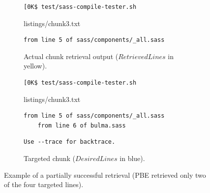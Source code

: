 \begin{figure}[tbp]
  \centering
\begin{subfigure}[b]{\columnwidth}
  \begin{lstlisting}[breaklines=true,frame=tlr]
[0K$ test/sass-compile-tester.sh
  \end{lstlisting}
  \vspace{-\baselineskip}
  
	{listings/chunk3.txt}
  \vspace{-\baselineskip}
  \begin{lstlisting}[breaklines=true,frame=blr]
	from line 5 of sass/components/_all.sass
  \end{lstlisting}
	\caption{Actual chunk retrieval output ($RetrievedLines$
	in yellow).}
	\label{lst:pbe-part-success-output}
\end{subfigure}

\begin{subfigure}[b]{\columnwidth}
  \begin{lstlisting}[breaklines=true,frame=tlr]
[0K$ test/sass-compile-tester.sh
  \end{lstlisting}
  \vspace{-\baselineskip}
  
	{listings/chunk3.txt}
  \vspace{-\baselineskip}
  \begin{lstlisting}[backgroundcolor=\color{Cerulean!60},breaklines=true,frame=rl]
	from line 5 of sass/components/_all.sass
	from line 6 of bulma.sass
  \end{lstlisting}
  \vspace{-\baselineskip}
  \begin{lstlisting}[breaklines=true,frame=blr]
  Use --trace for backtrace.
  \end{lstlisting}
	\caption{Targeted chunk ($DesiredLines$ in blue).}
	\label{lst:pbe-part-success-desired}
\end{subfigure}
  \caption{Example of a partially successful retrieval
  (PBE retrieved only
  two of the four targeted lines).}
  \label{lst:pbe-partially-successful}
\end{figure}

